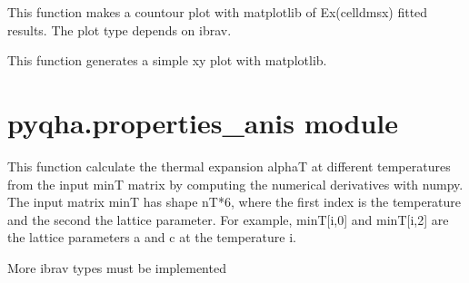 \documentclass[letterpaper,10pt,english]{sphinxmanual}
\begin{document}

\begin{fulllineitems}
\label{pyqha:pyqha.plotutils.plot_Etot_contour}
This function makes a countour plot with matplotlib of Ex(celldmsx) fitted results. 
The plot type depends on ibrav.

\end{fulllineitems}


\begin{fulllineitems}
\label{pyqha:pyqha.plotutils.simple_plot_xy}
This function generates a simple xy plot with matplotlib.

\end{fulllineitems}



\section{pyqha.properties\_anis module}
\label{pyqha:module-pyqha.properties_anis}\label{pyqha:pyqha-properties-anis-module}

\begin{fulllineitems}
\label{pyqha:pyqha.properties_anis.compute_alpha}
This function calculate the thermal expansion alphaT at different temperatures
from the input minT matrix by computing the numerical derivatives with numpy.
The input matrix minT has shape nT*6, where the first index is the temperature 
and the second the lattice parameter. For example, minT{[}i,0{]} and minT{[}i,2{]} are
the lattice parameters a and c at the temperature i.

More ibrav types must be implemented

\end{fulllineitems}

\end{document}
